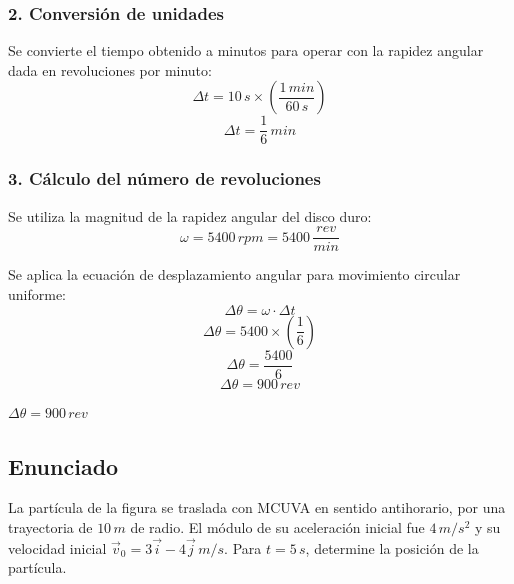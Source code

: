 \documentclass[12pt, a4paper]{article}
\begin{document}
\subsubsection*{2. Conversión de unidades}
Se convierte el tiempo obtenido a minutos para operar con la rapidez angular dada en revoluciones por minuto:
$$ \Delta t = 10 \, \si{s} \times \left( \frac{1 \, \si{min}}{60 \, \si{s}} \right) $$
$$ \Delta t = \frac{1}{6} \, \si{min} $$

\subsubsection*{3. Cálculo del número de revoluciones}
Se utiliza la magnitud de la rapidez angular del disco duro:
$$ \omega = 5400 \, \si{rpm} = 5400 \, \frac{\si{rev}}{\si{min}} $$

Se aplica la ecuación de desplazamiento angular para movimiento circular uniforme:
$$ \Delta \theta = \omega \cdot \Delta t $$
$$ \Delta \theta = 5400 \times \left( \frac{1}{6} \right) $$
$$ \Delta \theta = \frac{5400}{6} $$
$$ \Delta \theta = 900 \, \si{rev} $$

\begin{tcolorbox}[colback=green!5!white, colframe=green!50!black, title=Respuesta Final]
\centering \Large $\Delta \theta = 900 \, \si{rev}$
\end{tcolorbox}

\newpage

\subsection*{Enunciado}
La partícula de la figura se traslada con MCUVA en sentido antihorario, por una trayectoria de $10 \, \si{m}$ de radio. El módulo de su aceleración inicial fue $4 \, \si{m/s^2}$ y su velocidad inicial $\vec{v}_0 = 3\vec{i} - 4\vec{j} \, \si{m/s}$. Para $t = 5 \, \si{s}$, determine la posición de la partícula.

\begin{center}
\end{center}
\end{document}

